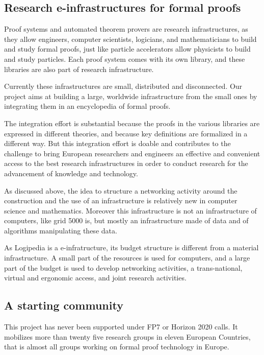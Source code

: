 \subsection{Research e-infrastructures for formal proofs}

Proof systems and automated theorem provers are research
infrastructures, as they allow engineers, computer scientists,
logicians, and mathematicians to build and study formal proofs, just
like particle accelerators allow physicists to build and study
particles. Each proof system comes with its own library, and these
libraries are also part of research infrastructure.

Currently these infrastructures are small, distributed and
disconnected.  Our project aims at building a large, worldwide
infrastructure from the small ones by integrating them in an
encyclopedia of formal proofs.

The integration effort is substantial because the proofs in the
various libraries are expressed in different theories, and because key
definitions are formalized in a different way.  But this integration
effort is doable and contributes to the challenge to bring European
researchers and engineers an effective and convenient access to the
best research infrastructures in order to conduct research for the
advancement of knowledge and technology.

As discussed above, the idea to structure a networking activity around
the construction and the use of an infrastructure is relatively new in
computer science and mathematics. Moreover this infrastructure is not
an infrastructure of computers, like grid 5000 is, but mostly an
infrastructure made of data and of algorithms manipulating these data.

As Logipedia is a e-infratructure, its budget structure is different
from a material infrastructure. A small part of the resources is used
for computers, and a large part of the budget is used to develop
networking activities, a trans-national, virtual and ergonomic access, 
and joint research activities.


\subsection{A starting community}

This project has never been supported under FP7 or Horizon 2020 calls.
It mobilizes more than twenty five research groups in eleven European
Countries, that is almost all groups working on formal proof
technology in Europe.

